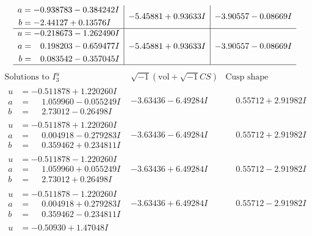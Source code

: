 \documentclass[1p]{elsarticle_modified}
\theoremstyle{definition}
\newcommand{\I}{\sqrt{-1}}
\begin{document}
$$\begin{array}{c|c|c}
\begin{aligned}
a &= -0.938783 - 0.384242 I \\
b &= -2.44127 + 0.13576 I\end{aligned}
 & -5.45881 + 0.93633 I & -3.90557 - 0.08669 I \\ \hline\begin{aligned}
u &= -0.218673 - 1.262490 I \\
a &= \phantom{-}0.198203 - 0.659477 I \\
b &= \phantom{-}0.083542 - 0.357045 I\end{aligned}
 & -5.45881 + 0.93633 I & -3.90557 - 0.08669 I\\
 \hline 
 \end{array}$$\newpage$$\begin{array}{c|c|c}  
\text{Solutions to }I^u_{3}& \I (\text{vol} + \sqrt{-1}CS) & \text{Cusp shape}\\
 \hline 
\begin{aligned}
u &= -0.511878 + 1.220260 I \\
a &= \phantom{-}1.059960 - 0.055249 I \\
b &= \phantom{-}2.73012 - 0.26498 I\end{aligned}
 & -3.63436 - 6.49284 I & \phantom{-}0.55712 + 2.91982 I \\ \hline\begin{aligned}
u &= -0.511878 + 1.220260 I \\
a &= \phantom{-}0.004918 - 0.279283 I \\
b &= \phantom{-}0.359462 + 0.234811 I\end{aligned}
 & -3.63436 - 6.49284 I & \phantom{-}0.55712 + 2.91982 I \\ \hline\begin{aligned}
u &= -0.511878 - 1.220260 I \\
a &= \phantom{-}1.059960 + 0.055249 I \\
b &= \phantom{-}2.73012 + 0.26498 I\end{aligned}
 & -3.63436 + 6.49284 I & \phantom{-}0.55712 - 2.91982 I \\ \hline\begin{aligned}
u &= -0.511878 - 1.220260 I \\
a &= \phantom{-}0.004918 + 0.279283 I \\
b &= \phantom{-}0.359462 - 0.234811 I\end{aligned}
 & -3.63436 + 6.49284 I & \phantom{-}0.55712 - 2.91982 I \\ \hline\begin{aligned}
u &= -0.50930 + 1.47048 I \\

\end{aligned}
\end{array}$$
\end{document}
